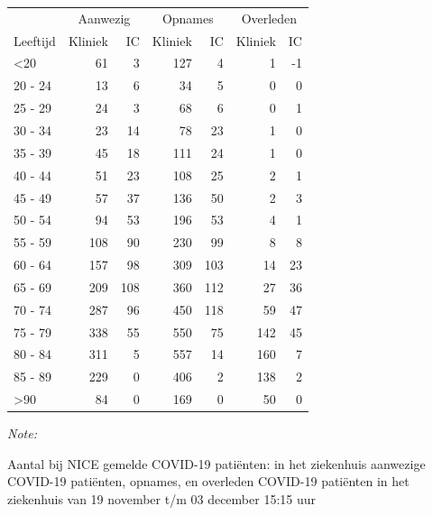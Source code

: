 \documentclass[
  english,
  man,floatsintext]{apa6}
\begin{document}
\begin{table}
\centering\begingroup\fontsize{10}{12}\selectfont

\begin{threeparttable}
\begin{tabular}{lrrrrrr}
\toprule
\multicolumn{1}{c}{ } & \multicolumn{2}{c}{Aanwezig} & \multicolumn{2}{c}{Opnames} & \multicolumn{2}{c}{Overleden} \\
\cmidrule(l{3pt}r{3pt}){2-3} \cmidrule(l{3pt}r{3pt}){4-5} \cmidrule(l{3pt}r{3pt}){6-7}
Leeftijd & Kliniek & IC & Kliniek & IC & Kliniek & IC\\
\midrule
<20 & 61 & 3 & 127 & 4 & 1 & -1\\
20 - 24 & 13 & 6 & 34 & 5 & 0 & 0\\
25 - 29 & 24 & 3 & 68 & 6 & 0 & 1\\
30 - 34 & 23 & 14 & 78 & 23 & 1 & 0\\
35 - 39 & 45 & 18 & 111 & 24 & 1 & 0\\
40 - 44 & 51 & 23 & 108 & 25 & 2 & 1\\
45 - 49 & 57 & 37 & 136 & 50 & 2 & 3\\
50 - 54 & 94 & 53 & 196 & 53 & 4 & 1\\
55 - 59 & 108 & 90 & 230 & 99 & 8 & 8\\
60 - 64 & 157 & 98 & 309 & 103 & 14 & 23\\
65 - 69 & 209 & 108 & 360 & 112 & 27 & 36\\
70 - 74 & 287 & 96 & 450 & 118 & 59 & 47\\
75 - 79 & 338 & 55 & 550 & 75 & 142 & 45\\
80 - 84 & 311 & 5 & 557 & 14 & 160 & 7\\
85 - 89 & 229 & 0 & 406 & 2 & 138 & 2\\
>90 & 84 & 0 & 169 & 0 & 50 & 0\\
\bottomrule
\end{tabular}
\begin{tablenotes}
\item \textit{Note: } 
\item Aantal bij NICE gemelde COVID-19 patiënten: in het ziekenhuis aanwezige COVID-19 patiënten, opnames, en overleden COVID-19 patiënten in het ziekenhuis van 19 november t/m 03 december 15:15 uur
\end{tablenotes}
\end{threeparttable}
\endgroup{}
\end{table}

\newpage
\end{document}
